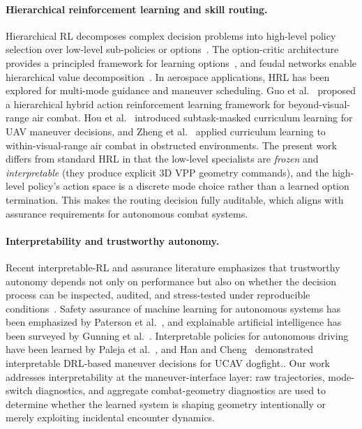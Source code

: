 \documentclass[5p,times]{elsarticle} %
\begin{document}
\paragraph{Hierarchical reinforcement learning and skill routing.}
Hierarchical RL decomposes complex decision problems into high-level policy selection over low-level sub-policies or options~\cite{sutton1999options}. The option-critic architecture provides a principled framework for learning options~\cite{bacon2017optioncritic}, and feudal networks enable hierarchical value decomposition~\cite{vezhnevets2017feudal}. In aerospace applications, HRL has been explored for multi-mode guidance and maneuver scheduling.
Guo et al.~\cite{guo2026hierarchical} proposed a hierarchical hybrid action reinforcement learning framework for beyond-visual-range air combat. Hou et al.~\cite{hou2023subtask} introduced subtask-masked curriculum learning for UAV maneuver decisions, and Zheng et al.~\cite{zheng2026wvr} applied curriculum learning to within-visual-range air combat in obstructed environments. The present work differs from standard HRL in that the low-level specialists are \emph{frozen} and \emph{interpretable} (they produce explicit 3D VPP geometry commands), and the high-level policy's action space is a discrete mode choice rather than a learned option termination. This makes the routing decision fully auditable, which aligns with assurance requirements for autonomous combat systems.

\paragraph{Interpretability and trustworthy autonomy.}
Recent interpretable-RL and assurance literature emphasizes that trustworthy autonomy depends not only on performance but also on whether the decision process can be inspected, audited, and stress-tested under reproducible conditions~\cite{glanois2024}. Safety assurance of machine learning for autonomous systems has been emphasized by Paterson et al.~\cite{paterson2025}, and explainable artificial intelligence has been surveyed by Gunning et al.~\cite{gunning2019}. Interpretable policies for autonomous driving have been learned by Paleja et al.~\cite{paleja2022}, and Han and Cheng~\cite{han2024smc} demonstrated interpretable DRL-based maneuver decisions for UCAV dogfight.. Our work addresses interpretability at the maneuver-interface layer: raw trajectories, mode-switch diagnostics, and aggregate combat-geometry diagnostics are used to determine whether the learned system is shaping geometry intentionally or merely exploiting incidental encounter dynamics.
\end{document}
